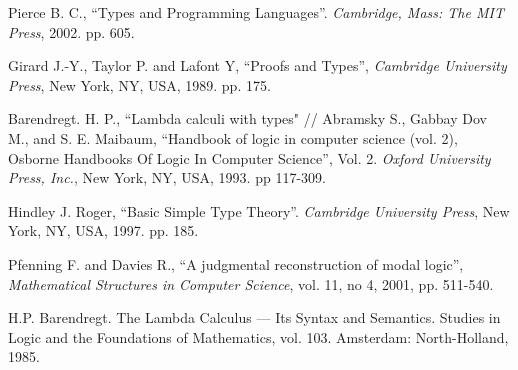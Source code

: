 \documentclass[a4paper]{article}
\begin{document}
\begin{thebibliography}{}
   Pierce B. C., ``Types and Programming Languages''. \textit{Cambridge, Mass: The MIT
  Press}, 2002. pp. 605. \parskip=1mm

   Girard J.-Y., Taylor P. and  Lafont Y, ``Proofs and Types'', \textit{Cambridge University
  Press}, New York, NY, USA, 1989. pp. 175. \parskip=1mm

   Barendregt. H. P., ``Lambda calculi with types" // Abramsky S., Gabbay Dov M., and S. E.
  Maibaum, ``Handbook of logic in computer science (vol. 2), Osborne Handbooks Of Logic In Computer
  Science'', Vol. 2. \textit{Oxford University Press, Inc.}, New York, NY, USA, 1993. pp 117-309.
  \parskip=1mm

   Hindley J. Roger, ``Basic Simple Type Theory''. \textit{Cambridge University Press}, New
  York, NY, USA, 1997. pp. 185. \parskip=1mm

   Pfenning F. and Davies R., ``A judgmental reconstruction of modal logic'',
  \textit{Mathematical Structures in Computer Science}, vol. 11, no 4, 2001, pp. 511-540. \parskip=1mm

   H.P. Barendregt. The Lambda Calculus --- Its Syntax and Semantics. Studies in Logic and
  the Foundations of Mathematics, vol. 103. Amsterdam: North-Holland, 1985.
  \end{thebibliography}
\end{document}
